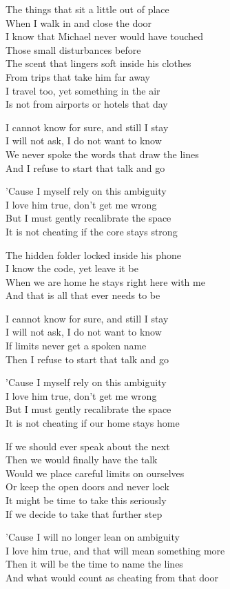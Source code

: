 \begin{lyrics}
The things that sit a little out of place\\
When I walk in and close the door\\
I know that Michael never would have touched\\
Those small disturbances before\\
The scent that lingers soft inside his clothes\\
From trips that take him far away\\
I travel too, yet something in the air\\
Is not from airports or hotels that day

I cannot know for sure, and still I stay\\
I will not ask, I do not want to know\\
We never spoke the words that draw the lines\\
And I refuse to start that talk and go

’Cause I myself rely on this ambiguity\\
I love him true, don’t get me wrong\\
But I must gently recalibrate the space\\
It is not cheating if the core stays strong

The hidden folder locked inside his phone\\
I know the code, yet leave it be\\
When we are home he stays right here with me\\
And that is all that ever needs to be

I cannot know for sure, and still I stay\\
I will not ask, I do not want to know\\
If limits never get a spoken name\\
Then I refuse to start that talk and go

’Cause I myself rely on this ambiguity\\
I love him true, don’t get me wrong\\
But I must gently recalibrate the space\\
It is not cheating if our home stays home

If we should ever speak about the next\\
Then we would finally have the talk\\
Would we place careful limits on ourselves\\
Or keep the open doors and never lock\\
It might be time to take this seriously\\
If we decide to take that further step

’Cause I will no longer lean on ambiguity\\
I love him true, and that will mean something more\\
Then it will be the time to name the lines\\
And what would count as cheating from that door
\end{lyrics}

